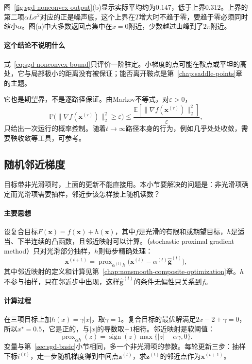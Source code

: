 图~\ref{fig:sgd-nonconvex-output}(b)显示实际平均约为$0.147$，低于上界$0.312$。上界的第二项$\alpha L\sigma^2$对应的正是噪声底，这个上界在$T$增大时不趋于零，要趋于零必须同时缩小$\alpha$。图(a)中大多数返回点集中在$x=0$附近，少数越过山峰到了$2\pi$附近。

\paragraph{这个结论不说明什么}
式~\eqref{eq:sgd-nonconvex-bound}只评价一阶驻定。小梯度的点可能在鞍点或平坦的高处，它与局部极小的距离没有被保证；能否离开鞍点是第~\ref{chap:saddle-points}章的主题。

它也是期望界，不是逐路径保证。由Markov不等式，对$\varepsilon>0$，
\[
 \mathbb{P}\bigl(\lVert\nabla f(\bm{x}^{(\tau)})\rVert_2^2\geq\varepsilon\bigr)\leq\frac{\mathbb{E}[\lVert\nabla f(\bm{x}^{(\tau)})\rVert_2^2]}{\varepsilon},
\]
只给出一次运行的概率控制。随着$t\to\infty$路径本身的行为，例如几乎处处收敛，需要鞅收敛等工具，可参考。

\subsection{随机邻近梯度}
\label{sec:sgd-proximal}

目标带非光滑项时，上面的更新不能直接用。本小节要解决的问题是：非光滑项确定而光滑项需要抽样，邻近步该怎样接上随机读数？

\paragraph{主要思想}
设复合目标$F(\bm{x})=f(\bm{x})+h(\bm{x})$，其中$f$是光滑的有限和或期望目标，$h$是适当、下半连续的凸函数，且邻近映射可以计算。（stochastic proximal gradient method）只对光滑部分抽样，$h$则每步精确处理：
\begin{equation}
 \bm{x}^{(t+1)}=\operatorname{prox}_{\alpha^{(t)}h}\bigl(\bm{x}^{(t)}-\alpha^{(t)}\hat{\bm{g}}^{(t)}\bigr),
 \label{eq:sgd-prox-update}
\end{equation}
其中邻近映射的定义和计算见第~\ref{chap:nonsmooth-composite-optimization}章。$h$不参与抽样，只在邻近步中出现，这样$\hat{\bm{g}}^{(t)}$的条件无偏性只关系到$f$。

\paragraph{计算过程}
在三项目标上加$h(x)=\gamma\lvert x\rvert$，取$\gamma=1$。复合目标的最优解满足$2x-2+\gamma=0$，所以$x^\star=0.5$，它是正的，与$\lvert x\rvert$的导数取$+1$相符。邻近映射是软阈值：
\[
 \operatorname{prox}_{\alpha h}(z)=\operatorname{sign}(z)\max\{\lvert z\rvert-\alpha\gamma,0\}.
\]
变量与第~\ref{sec:sgd-basic}小节相同，多一个非光滑项的参数。每轮更新三步：抽样下标$i^{(t)}$，走一步随机梯度得到中间点$\bm{z}^{(t)}$，求$\bm{z}^{(t)}$的邻近点作为$\bm{x}^{(t+1)}$。

